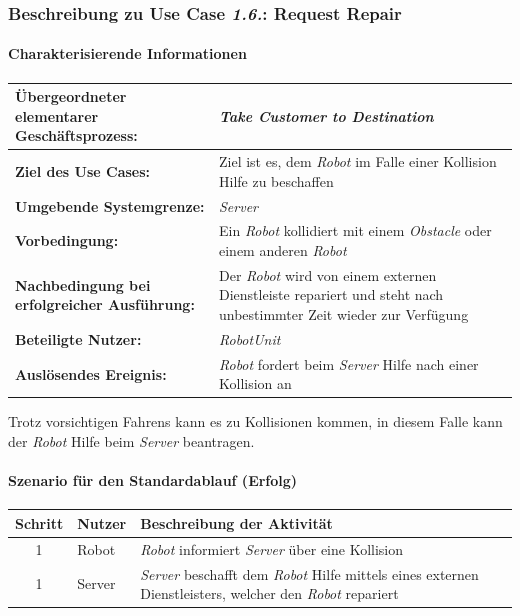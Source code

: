 		\subsubsection{Beschreibung zu Use Case \emph{1.6.}: Request Repair}
		
		\paragraph*{Charakterisierende Informationen}
		
		\begin{table}[H]
			\centering
			\begin{tabularx}{\textwidth}{|p{5cm}|X|}
				\hline
				\textbf{Übergeordneter elementarer Geschäftsprozess:} & \emph{Take Customer to Destination} \\ \hline
				\textbf{Ziel des Use Cases:} & Ziel ist es, dem \emph{Robot} im Falle einer Kollision Hilfe zu beschaffen \\ \hline
				\textbf{Umgebende Systemgrenze:} & \emph{Server}\\ \hline
				\textbf{Vorbedingung:} & Ein \emph{Robot} kollidiert mit einem \emph{Obstacle} oder einem anderen \emph{Robot} \\ \hline
				\textbf{Nachbedingung bei erfolgreicher Ausführung:} & Der \emph{Robot} wird von einem externen Dienstleiste repariert und steht nach unbestimmter Zeit wieder zur Verfügung \\ \hline
				\textbf{Beteiligte Nutzer:} & \emph{RobotUnit}\\ \hline
				\textbf{Auslösendes Ereignis:} & \emph{Robot} fordert beim \emph{Server} Hilfe nach einer Kollision an \\
				\hline
			\end{tabularx}
		\end{table}
		
		Trotz vorsichtigen Fahrens kann es zu Kollisionen kommen, in diesem Falle kann der \emph{Robot} Hilfe beim \emph{Server} beantragen.
		
		\paragraph*{Szenario für den Standardablauf (Erfolg)}
		
		\begin{table}[H]
			\centering
			\begin{tabularx}{\textwidth}{|c|p{2cm}|X|}
				\hline
				Schritt & Nutzer & Beschreibung der Aktivität \\ \hline
				1 & Robot & \emph{Robot} informiert \emph{Server} über eine Kollision \\
				1 & Server & \emph{Server} beschafft dem \emph{Robot} Hilfe mittels eines externen Dienstleisters, welcher den \emph{Robot} repariert \\
				\hline
			\end{tabularx}
		\end{table}
		
